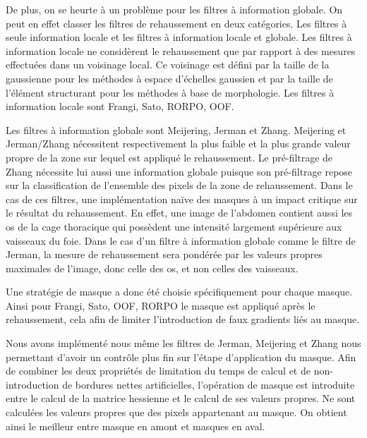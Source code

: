 De plus, on se heurte à un problème pour les filtres à information globale. On peut en effet classer les filtres de rehaussement en deux catégories. Les filtres à seule information locale et les filtres à information locale et globale. Les filtres à information locale ne considèrent le rehaussement que par rapport à des mesures effectuées dans un voisinage local. Ce voisinage est défini par la taille de la gaussienne pour les méthodes à espace d'échelles gaussien et par la taille de l'élément structurant pour les méthodes à base de morphologie. Les filtres à information locale sont Frangi, Sato, RORPO, OOF.

Les filtres à information globale sont Meijering, Jerman et Zhang. Meijering et Jerman/Zhang nécessitent respectivement la plus faible et la plus grande valeur propre de la zone sur lequel est appliqué le rehaussement. Le pré-filtrage de Zhang nécessite lui aussi une information globale puisque son pré-filtrage repose sur la classification de l'ensemble des pixels de la zone de rehaussement. Dans le cas de ces filtres, une implémentation naïve des masques à un impact critique sur le résultat du rehaussement. En effet, une image de l'abdomen contient aussi les os de la cage thoracique qui possèdent une intensité largement supérieure aux vaisseaux du foie. Dans le cas d'un filtre à information globale comme le filtre de Jerman, la mesure de rehaussement sera pondérée par les valeurs propres maximales de l'image, donc celle des os, et non celles des vaisseaux. 

Une stratégie de masque a donc été choisie spécifiquement pour chaque masque. Ainsi pour Frangi, Sato, OOF, RORPO le masque est appliqué après le rehaussement, cela afin de limiter l'introduction de faux gradients liés au masque.

Nous avons implémenté nous même les filtres de Jerman, Meijering et Zhang nous permettant d'avoir un contrôle plus fin sur l'étape d'application du masque. Afin de combiner les deux propriétés de limitation du temps de calcul et de non-introduction de bordures nettes artificielles, l'opération de masque est introduite entre le calcul de la matrice hessienne et le calcul de ses valeurs propres. Ne sont calculées les valeurs propres que des pixels appartenant au masque. On obtient ainsi le meilleur entre masque en amont et masques en aval.

